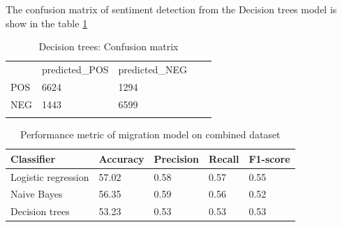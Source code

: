 \begin{itemize}
    The confusion matrix of sentiment detection from the Decision trees model is show in the table \ref{tab:confusionmatrix_sentimentmigrationtweets_DT}
    
    \begin{table}[]
\centering
\begin{tabular}{lllll}
\cline{1-3}
\multicolumn{1}{|l|}{}   & \multicolumn{1}{l|}{predicted\_POS} & \multicolumn{1}{l|}{predicted\_NEG}  &  &  \\ \cline{1-3}
\multicolumn{1}{|l|}{POS} & \multicolumn{1}{l|}{6624}  & \multicolumn{1}{l|}{1294} &  &  \\ \cline{1-3}
\multicolumn{1}{|l|}{NEG}   & \multicolumn{1}{l|}{1443}  & \multicolumn{1}{l|}{6599}  &  &  \\ \cline{1-3}
                            &                           &                           &  & 
\end{tabular}
\caption{Decision trees: Confusion matrix}
\label{tab:confusionmatrix_sentimentmigrationtweets_DT}
\end{table}
     
\end{itemize}


\begin{table}[]
\centering
\begin{tabular}{lllll}
\hline
\textbf{Classifier} & \textbf{Accuracy} & \textbf{Precision} & \textbf{Recall} & \textbf{F1-score} \\ \hline
Logistic regression & 57.02             & 0.58              & 0.57          & 0.55              \\ \hline
Naive Bayes & 56.35             & 0.59              & 0.56          & 0.52             \\ \hline
Decision trees & 53.23             & 0.53              & 0.53          & 0.53             \\ \hline

\end{tabular}
\caption{Performance metric of migration model on combined dataset}
\label{tab:sentiment_of_Migration_metric}
\end{table}

 